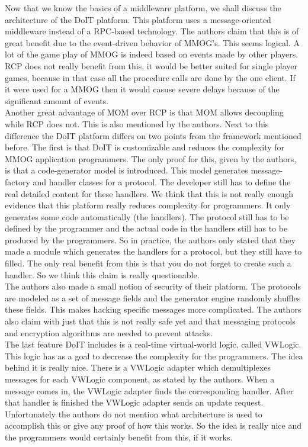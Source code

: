Now that we know the basics of a middleware platform, we shall discuss the architecture of the DoIT platform. 
This platform uses a message-oriented middleware instead of a RPC-based technology. 
The authors claim that this is of great benefit due to the event-driven behavior of MMOG's. 
This seems logical. A lot of the game play of MMOG is indeed based on events made by other players. 
RCP does not really benefit from this, it would be better suited for single player games, because in that case all the procedure calls are done by the one client. 
If it were used for a MMOG then it would casuse severe delays because of the significant amount of events.\\
Another great advantage of MOM over RCP is that MOM allows decoupling while RCP does not. 
This is also mentioned by the authors. 
Next to this difference the DoIT platform differs on two points from the framework mentioned before. 
The first is that DoIT is customizable and reduces the complexity for MMOG application programmers. 
The only proof for this, given by the authors, is that a code-generator model is introduced. 
This model generates message-factory and handler classes for a protocol. 
The developer still has to define the real detailed content for these handlers. 
We think that this is not really enough evidence that this platform really reduces complexity for programmers. 
It only generates some code automatically (the handlers). 
The protocol still has to be defined by the programmer and the actual code in the handlers still has to be produced by the programmers. 
So in practice, the authors only stated that they made a module which generates the handlers for a protocol, but they still have to filled. The only real benefit from this is that you do not forget to create such a handler. So we think this claim is really questionable.\\
The authors also made a small notion of security of their platform. 
The protocols are modeled as a set of message fields and the generator engine randomly shuffles these fields. 
This makes hacking specific messages more complicated. 
The authors also claim with just that this is not really safe yet and that messaging protocols and encryption algorithms are needed to prevent attacks.\\

The last feature DoIT includes is a real-time virtual-world logic, called VWLogic. 
This logic has as a goal to decrease the complexity for the programmers. 
The idea behind it is really nice. 
There is a VWLogic adapter which demultiplexes messages for each VWLogic component, as stated by the authors. 
When a message comes in, the VWLogic adapter finds the corresponding handler. 
After that handler is finished the VWLogic adapter sends an update request. 
Unfortunately the authors do not mention what architecture is used to accomplish this or give any proof of how this works. 
So the idea is really nice and the programmers would certainly benefit from this, if it works.\\

